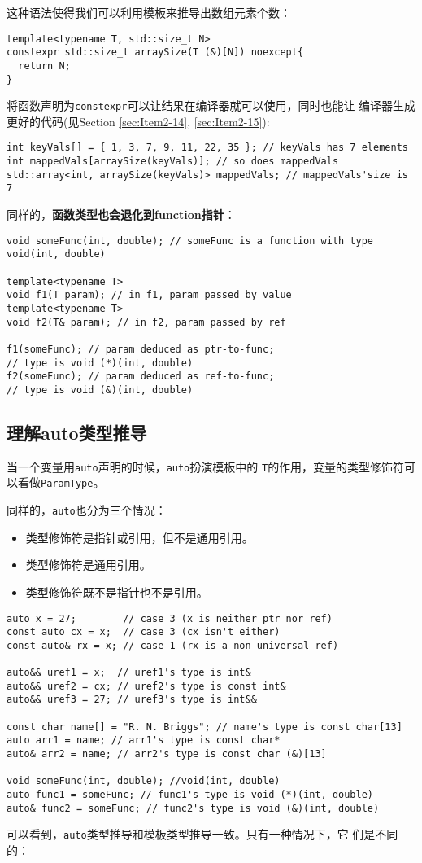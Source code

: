 这种语法使得我们可以利用模板来推导出数组元素个数：
\begin{verbatim}
template<typename T, std::size_t N> 
constexpr std::size_t arraySize(T (&)[N]) noexcept{
  return N; 
}
\end{verbatim}

将函数声明为\texttt{constexpr}可以让结果在编译器就可以使用，同时也能让
编译器生成更好的代码(见Section \ref{sec:Item2-14}, \ref{sec:Item2-15}):
\begin{verbatim}
int keyVals[] = { 1, 3, 7, 9, 11, 22, 35 }; // keyVals has 7 elements
int mappedVals[arraySize(keyVals)]; // so does mappedVals
std::array<int, arraySize(keyVals)> mappedVals; // mappedVals'size is 7 
\end{verbatim}

同样的，\textbf{函数类型也会退化到function指针}：

\begin{verbatim}
void someFunc(int, double); // someFunc is a function with type
void(int, double)

template<typename T>
void f1(T param); // in f1, param passed by value
template<typename T>
void f2(T& param); // in f2, param passed by ref

f1(someFunc); // param deduced as ptr-to-func;
// type is void (*)(int, double)
f2(someFunc); // param deduced as ref-to-func;
// type is void (&)(int, double)
\end{verbatim}

\subsection{理解auto类型推导}
\label{sec:Item2-2}

当一个变量用\texttt{auto}声明的时候，\texttt{auto}扮演模板中的
\texttt{T}的作用，变量的类型修饰符可以看做\texttt{ParamType}。

同样的，\texttt{auto}也分为三个情况：
\begin{itemize}
\item 类型修饰符是指针或引用，但不是通用引用。
\item 类型修饰符是通用引用。
\item 类型修饰符既不是指针也不是引用。
\end{itemize}

\begin{verbatim}
auto x = 27;        // case 3 (x is neither ptr nor ref)
const auto cx = x;  // case 3 (cx isn't either)
const auto& rx = x; // case 1 (rx is a non-universal ref)

auto&& uref1 = x;  // uref1's type is int&
auto&& uref2 = cx; // uref2's type is const int&
auto&& uref3 = 27; // uref3's type is int&&

const char name[] = "R. N. Briggs"; // name's type is const char[13]
auto arr1 = name; // arr1's type is const char*
auto& arr2 = name; // arr2's type is const char (&)[13]

void someFunc(int, double); //void(int, double)
auto func1 = someFunc; // func1's type is void (*)(int, double)
auto& func2 = someFunc; // func2's type is void (&)(int, double)
\end{verbatim}
可以看到，\texttt{auto}类型推导和模板类型推导一致。只有一种情况下，它
们是不同的：

